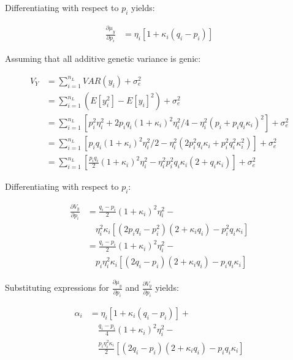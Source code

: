 \documentclass[12pt]{article}
\begin{document}
\begin{bibunit}
Differentiating with respect to $p_i$ yields:

\begin{equation}
\begin{array}{rl}
\frac{\partial \mu_y}{\partial p_i} 
&= \eta_i[1 + \kappa_i(q_i - p_i)]
\end{array}
\end{equation}


Assuming that all additive genetic variance is genic:

\begin{equation}
\begin{array}{rl}
V_Y &= \sum_{i=1}^{n_L} VAR(y_i) + \sigma^2_e\\
&= \sum_{i=1}^{n_L} (E[y_i^2] - E[y_i]^2) + \sigma^2_e\\
&= \sum_{i=1}^{n_L} [p_i^2\eta_i^2 + 2p_iq_i(1 + \kappa_i)^2 \eta_i^2/4 - \eta_i^2(p_i + p_iq_i\kappa_i)^2] + \sigma^2_e\\
&= \sum_{i=1}^{n_L} [p_iq_i(1 + \kappa_i)^2\eta_i^2/2 - \eta_i^2(2p_i^2q_i\kappa_i + p_i^2q_i^2\kappa_i^2)] + \sigma^2_e\\
&= \sum_{i=1}^{n_L} [\frac{p_iq_i}{2}(1 + \kappa_i)^2\eta_i^2 - \eta_i^2p_i^2q_i\kappa_i(2 + q_i\kappa_i)] + \sigma^2_e
\end{array}
\end{equation}

Differentiating with respect to $p_i$:

\begin{equation}
\begin{array}{rl}
\frac{\partial V_y}{\partial p_i} &= \frac{q_i-p_i}{2}(1 + \kappa_i)^2\eta_i^2 - \\
&\quad \eta_i^2\kappa_i[(2p_iq_i -p_i^2)(2 + \kappa_iq_i) -p_i^2q_i\kappa_i] \\
&= \frac{q_i-p_i}{2}(1 + \kappa_i)^2\eta_i^2 - \\
&\quad p_i\eta_i^2\kappa_i[(2q_i -p_i)(2 + \kappa_iq_i) -p_iq_i\kappa_i] 
\end{array}
\end{equation}

Substituting expressions for $\frac{\partial \mu_y}{\partial p_i}$ and $\frac{\partial V_y}{\partial p_i}$ yields:

\begin{equation}
\begin{array}{rl}
\alpha_i&= \eta_i[1 + \kappa_i(q_i - p_i)]  + \\
&\quad \frac{q_i-p_i}{4}(1 + \kappa_i)^2\eta_i^2 - \\
&\quad \frac{p_i\eta_i^2\kappa_i}{2}[(2q_i -p_i)(2 + \kappa_iq_i) -p_iq_i\kappa_i] \\


\end{array}
\end{equation}
\end{bibunit}
\end{document}
